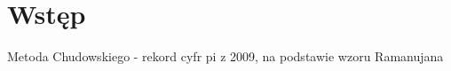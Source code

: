 \documentclass[11pt, wide, leqno]{mwart}
\begin{document}
\maketitle
\tableofcontents

\section{Wstęp}\label{sec:ws}

Metoda Chudowskiego - rekord cyfr pi z 2009, na podstawie wzoru Ramanujana


\end{document}
